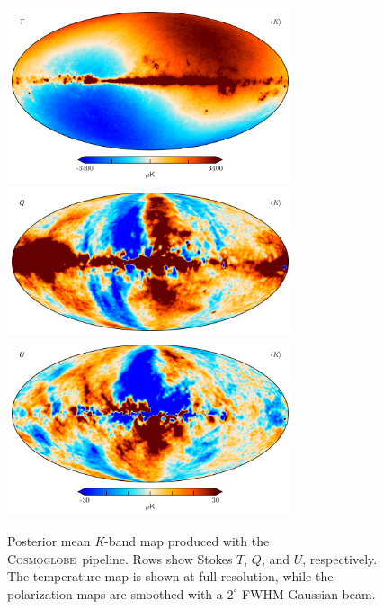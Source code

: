 \documentclass[twocolumn]{../../common/aa}
\newcommand{\cosmoglobe}{\textsc{Cosmoglobe}}
\newcommand{\K}[0]{\textit K}
\begin{document}
\begin{figure}
	\centering
	\includegraphics[width=0.75\textwidth]{figures/023-WMAP_K_mu_I.pdf}
	\includegraphics[width=0.75\textwidth]{figures/023-WMAP_K_mu_Q.pdf}
	\includegraphics[width=0.75\textwidth]{figures/023-WMAP_K_mu_U.pdf}
	\caption{Posterior mean \K-band map produced with the \cosmoglobe\ pipeline. Rows show Stokes $T$, $Q$, and $U$, respectively. The temperature map is shown at full resolution, while the polarization maps are smoothed with a $2^{\circ}$ FWHM Gaussian beam.}
	\label{fig:kband}
\end{figure}
\end{document}
